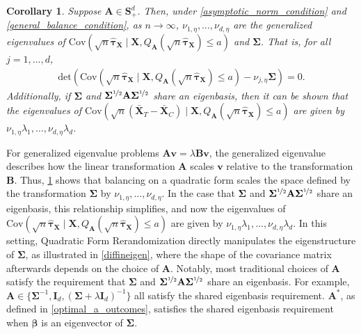 \documentclass[11pt,twoside]{article}
\newtheorem{corollary}{Corollary}
\theoremstyle{definition}
\theoremstyle{remark}
\begin{document}
\begin{corollary}\label{eigenvalues_qfr}
    Suppose $\mathbf{A} \in \mathbf{S}^d_{+}$. Then, under \cref{asymptotic_norm_condition} and \cref{general_balance_condition}, as $n \to \infty$, $\nu_{1, \eta}, \ldots, \nu_{d, \eta}$ are the generalized eigenvalues of $\text{Cov}\left(\sqrt{n} \widehat{\bm{\tau}}_{\mathbf{X}} \mid \mathbf{X}, Q_\mathbf{A}(\sqrt{n} \widehat{\bm{\tau}}_{\mathbf{X}}) \leq a\right)$ and $\mathbf{\Sigma}$. That is, for all $j = 1, \ldots, d$,
    \begin{align*}
    \text{det}\left(\text{Cov}\left(\sqrt{n} \widehat{\bm{\tau}}_{\mathbf{X}} \mid \mathbf{X}, Q_\mathbf{A}(\sqrt{n} \widehat{\bm{\tau}}_{\mathbf{X}}) \leq a\right) - \nu_{j, \eta} \mathbf{\Sigma} \right) = 0.
    \end{align*}
    Additionally, if $\mathbf{\Sigma}$ and $\mathbf{\Sigma}^{\nicefrac{1}{2}} \mathbf{A} \mathbf{\Sigma}^{\nicefrac{1}{2}}$ share an eigenbasis, then it can be shown that the eigenvalues of $\text{Cov}\left(\sqrt{n}\left(\bar{\mathbf{X}}_T - \bar{\mathbf{X}}_C\right) \mid \mathbf{X},  Q_\mathbf{A}(\sqrt{n} \widehat{\bm{\tau}}_{\mathbf{X}}) \leq a\right)$ are given by $\nu_{1, \eta} \lambda_1, \ldots, \nu_{d, \eta} \lambda_d$.
\end{corollary}

For generalized eigenvalue problems $\mathbf{A}\mathbf{v} = \lambda \mathbf{B} \mathbf{v}$, the generalized eigenvalue describes how the linear transformation $\mathbf{A}$ scales $\mathbf{v}$ relative to the transformation $\mathbf{B}$. Thus, \cref{eigenvalues_qfr} shows that balancing on a quadratic form scales the space defined by the transformation $\mathbf{\Sigma}$ by $\nu_{1, \eta}, \ldots, \nu_{d, \eta}$. In the case that $\mathbf{\Sigma}$ and $\mathbf{\Sigma}^{\nicefrac{1}{2}} \mathbf{A} \mathbf{\Sigma}^{\nicefrac{1}{2}}$ share an eigenbasis, this relationship simplifies, and now the eigenvalues of $\text{Cov}\left(\sqrt{n} \widehat{\bm{\tau}}_{\mathbf{X}} \mid \mathbf{X}, Q_\mathbf{A}(\sqrt{n} \widehat{\bm{\tau}}_{\mathbf{X}}) \leq a\right)$ are given by $\nu_{1, \eta} \lambda_1, \ldots, \nu_{d, \eta} \lambda_d$. In this setting, Quadratic Form Rerandomization directly manipulates the eigenstructure of $\mathbf{\Sigma}$, as illustrated in \cref{diffineigen}, where the shape of the covariance matrix afterwards depends on the choice of $\mathbf{A}$. Notably, most traditional choices of $\mathbf{A}$ satisfy the requirement that $\mathbf{\Sigma}$ and $\mathbf{\Sigma}^{\nicefrac{1}{2}} \mathbf{A} \mathbf{\Sigma}^{\nicefrac{1}{2}}$ share an eigenbasis. For example, $\mathbf{A} \in \{\mathbf{\Sigma}^{-1}, \mathbf{I}_d, (\mathbf{\Sigma} + \lambda \mathbf{I}_d)^{-1}\}$ all satisfy the shared eigenbasis requirement. $\mathbf{A}^*$, as defined in \cref{optimal_a_outcomes}, satisfies the shared eigenbasis requirement when $\bm{\beta}$ is an eigenvector of $\mathbf{\Sigma}$.
\end{document}
